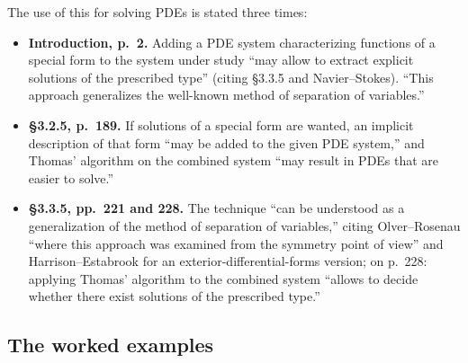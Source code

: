 \documentclass[11pt]{article}
\begin{document}
The use of this for solving PDEs is stated three times:
\begin{itemize}
\item \textbf{Introduction, p.~2.} Adding a PDE system characterizing
  functions of a special form to the system under study ``may allow to
  extract explicit solutions of the prescribed type'' (citing \S3.3.5 and
  Navier--Stokes). ``This approach generalizes the well-known method of
  separation of variables.''
\item \textbf{\S3.2.5, p.~189.} If solutions of a special form are wanted,
  an implicit description of that form ``may be added to the given PDE
  system,'' and Thomas' algorithm on the combined system ``may result in PDEs
  that are easier to solve.''
\item \textbf{\S3.3.5, pp.~221 and 228.} The technique ``can be understood as
  a generalization of the method of separation of variables,'' citing
  Olver--Rosenau \cite{OR86} ``where this approach was examined from the
  symmetry point of view'' and Harrison--Estabrook \cite{HE71} for an
  exterior-differential-forms version; on p.~228: applying Thomas' algorithm
  to the combined system ``allows to decide whether there exist solutions of
  the prescribed type.''
\end{itemize}

\subsection{The worked examples}
\end{document}
